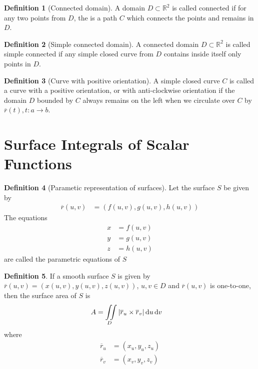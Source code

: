 \documentclass[fleqn, a4paper, 8pt, twoside]{amsart}
\theoremstyle{definition}
\theoremstyle{bluedefinition}
\newtheorem{definition}{Definition}
\theoremstyle{redtheorem}
\begin{document}
\begin{multicols}{2}
\begin{spacing}{0.7}
\begin{definition}[Connected domain]
	A domain $D \subset \mathbb{R}^2$ is called connected if for any two points from $D$, the is a path $C$ which connects the points and remains in $D$.
\end{definition}

\begin{definition}[Simple connected domain]
	A connected domain $D \subset \mathbb{R}^2$ is called simple connected if any simple closed curve from $D$ contains inside itself only points in $D$.
\end{definition}

\begin{definition}[Curve with positive orientation]
	A simple closed curve $C$ is called a curve with a positive orientation, or with anti-clockwise orientation if the domain $D$ bounded by $C$ always remains on the left when we circulate over $C$ by $\overline{r}(t), t : a \to b$.
\end{definition}

\section{Surface Integrals of Scalar Functions}

\begin{definition}[Parametic representation of surfaces]
	Let the surface $S$ be given by
	\begin{align*}
		\overline{r}(u,v) & = \left( f(u,v) , g(u,v) , h(u,v) \right)
	\end{align*}
	The equations
	\begin{align*}
		x & = f(u,v) \\
		y & = g(u,v) \\
		z & = h(u,v)
	\end{align*}
	are called the parametric equations of $S$
\end{definition}

\begin{definition}
	If a smooth surface $S$ is given by $\overline{r}(u,v) = \left( x(u,v) , y(u,v) , z(u,v) \right)$, $u,v \in D$ and $\overline{r}(u,v)$ is one-to-one, then the surface area of $S$ is
	\begin{align*}
		A & = \iint\limits_{D} \left| \overline{r}_u \times \overline{r}_v \right| \dif u \dif v
	\end{align*}
	where
	\begin{align*}
		\overline{r}_u & = (x_u, y_u, z_u) \\
		\overline{r}_v & = (x_v, y_v, z_v)
	\end{align*}
\end{definition}


\end{spacing}
\end{multicols}
\end{document}
